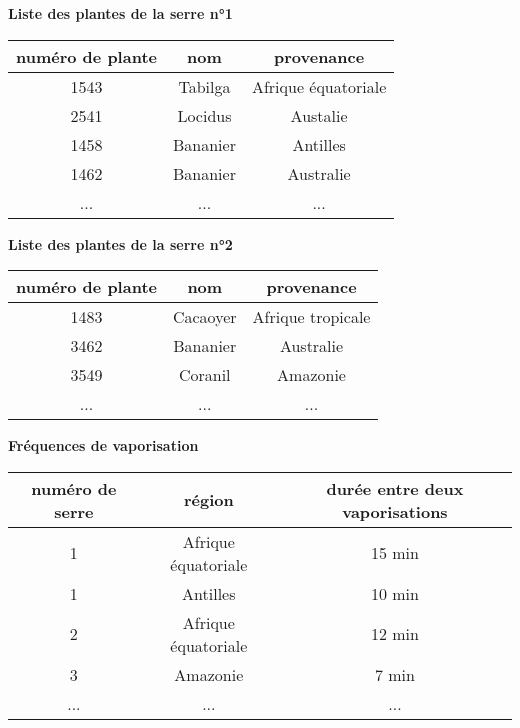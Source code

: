 \documentclass[a4paper,12pt,french]{article}
\begin{document}
\begin{center}
\textbf{Liste des plantes de la serre n°1}\\[1em]

\begin{tabular}{|c|c|c|}
\hline\rowcolor{orange@color}
\color{white}\textbf{numéro de plante} & \color{white}\textbf{nom} & \color{white}\textbf{provenance} \\
\hline
1543 & Tabilga & Afrique équatoriale \\
\hline
2541 & Locidus & Austalie \\
\hline
1458 & Bananier & Antilles \\
\hline
1462 & Bananier & Australie \\
\hline
... & ... & ... \\
\hline
\end{tabular}
\end{center}
\begin{center}
\textbf{Liste des plantes de la serre n°2}\\[1em]

\begin{tabular}{|c|c|c|}
\hline\rowcolor{orange@color}
\color{white}\textbf{numéro de plante} & \color{white}\textbf{nom} & \color{white}\textbf{provenance} \\
\hline
1483 & Cacaoyer & Afrique tropicale \\
\hline
3462 & Bananier & Australie \\
\hline
3549 & Coranil & Amazonie \\
\hline
... & ... & ... \\
\hline
\end{tabular}
\end{center}
\newpage
\begin{center}
\textbf{Fréquences de vaporisation}\\[1em]

\begin{tabular}{|c|c|c|}
\hline\rowcolor{orange@color}
\color{white}\textbf{numéro de serre} & \color{white}\textbf{région} & \color{white}\textbf{durée entre deux vaporisations} \\
\hline
1 & Afrique équatoriale & 15 min  \\
\hline
1 & Antilles & 10 min \\
\hline
2 & Afrique équatoriale & 12 min \\
\hline
3 & Amazonie & 7 min \\
\hline
... & ... & ... \\
\hline
\end{tabular}
\end{center}
\end{document}
